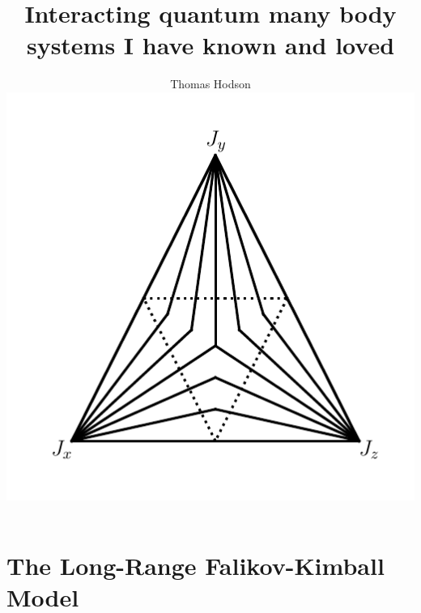 \documentclass[a4paper,12pt]{report}
\begin{document}
\title{\LARGE {\bf Interacting quantum many body systems I have known and loved}\\
 \vspace*{6mm}
}

\author{Thomas Hodson\\\vspace{10mm}
\includegraphics[width=.4\textwidth,height=.4\textheight]{figure_code/logo/logo}
\vspace{-0.4\textheight}
\vspace{10mm}
}

\normallinespacing

\maketitle


\preface



% 
% 

\body
% 

\chapter{The Long-Range Falikov-Kimball Model}





% 
% 
% 
% 

%     

\printbibliography

% 
\end{document}
